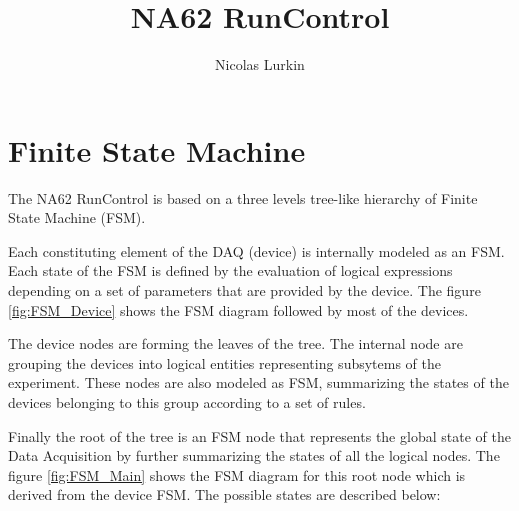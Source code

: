 \documentclass[a4paper]{article}
\title{NA62 RunControl}
\author{Nicolas Lurkin}
\begin{document}
\maketitle

\section{Finite State Machine}
The NA62 RunControl is based on a three levels tree-like hierarchy of Finite State Machine (FSM).

Each constituting element of the DAQ (device) is internally modeled as an FSM. Each state of the
FSM is defined by the evaluation of logical expressions depending on a set of parameters that are
provided by the device. The figure \ref{fig:FSM_Device} shows the FSM diagram followed by most of
the devices.

The device nodes are forming the leaves of the tree. The internal node are grouping the devices into
logical entities representing subsytems of the experiment. These nodes are also modeled as FSM,
summarizing the states of the devices belonging to this group according to a set of rules.

Finally the root of the tree is an FSM node that represents the global state of the Data Acquisition
by further summarizing the states of all the logical nodes. The figure \ref{fig:FSM_Main} shows the
FSM diagram for this root node which is derived from the device FSM. The possible states are
described below:
\end{document}
